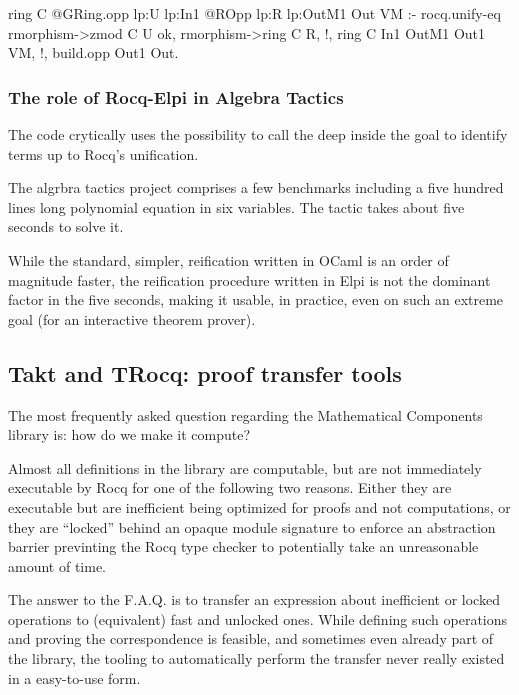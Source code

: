 \documentclass[a4paper, 11pt]{book}
\begin{document}
\begin{elpicode}
ring C {{ @GRing.opp lp:U lp:In1 }} {{ @ROpp lp:R lp:OutM1 }} Out VM :-
  rocq.unify-eq { rmorphism->zmod C } U ok,
  rmorphism->ring C R, !,
  ring C In1 OutM1 Out1 VM, !,
  build.opp Out1 Out.  
\end{elpicode}

\subsubsection{The role of Rocq-Elpi in Algebra Tactics}

The code crytically uses the possibility to call
the  deep inside the goal to identify
terms up to Rocq's unification.

The algrbra tactics project comprises a few benchmarks including
a five hundred lines long polynomial equation in six variables.
The  tactic takes about five seconds to solve it.

While the standard, simpler, reification written in OCaml is an order of
magnitude faster, the reification procedure written in Elpi is not the dominant
factor in the five seconds, making it usable, in practice, even on such an
extreme goal (for an interactive theorem prover).


\subsection{Takt and TRocq: proof transfer tools}

The most frequently asked question regarding the Mathematical Components
library is: how do we make it compute?

Almost all definitions in the library
are computable, but are not immediately executable by Rocq for one of
the following two reasons. Either they are executable but are inefficient
being optimized for proofs and not computations, or they are ``locked''
behind an opaque module signature to enforce an abstraction barrier previnting
the Rocq type checker to potentially take an unreasonable amount of time.

The answer to the F.A.Q. is to transfer an expression about inefficient or
locked operations to (equivalent) fast and unlocked ones. While defining
such operations and proving the correspondence is feasible, and sometimes
even already part of the library, the tooling to automatically perform
the transfer never really existed in a easy-to-use form.
\end{document}
